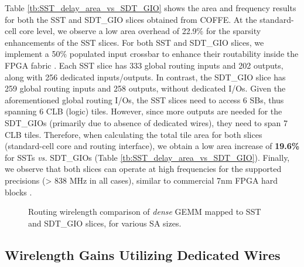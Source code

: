 Table \ref{tb:SST_delay_area_vs_SDT_GIO} shows the area and frequency results for both the SST and SDT\_GIO slices obtained from COFFE. 
At the standard-cell core level, we observe a low area overhead of 22.9\% for the sparsity enhancements of the SST slices.
For both SST and SDT\_GIO slices, we implement a 50\% populated input crossbar to enhance their routability inside the FPGA fabric \cite{COFFE2_TRETS_2019}. 
Each SST slice has 333 global routing inputs and 202 outputs, along with 256 dedicated inputs/outputs.
In contrast, the SDT\_GIO slice has 259 global routing inputs and 258 outputs, without dedicated I/Os.
Given the aforementioned global routing I/Os, the SST slices need to access 6 SBs, thus spanning 6  CLB (logic) tiles.
However, since more outputs are needed for the SDT\_GIOs (primarily due to absence of dedicated wires), they need to span 7 CLB tiles.
Therefore, when calculating the total tile area for both slices (standard-cell core and routing interface), we obtain a low area increase of \textbf{19.6\%} for 
SSTs \emph{vs.} SDT\_GIOs (Table \ref{tb:SST_delay_area_vs_SDT_GIO}).
Finally, we observe that both slices can operate at high frequencies for the supported precisions (> 838 MHz in all cases), similar to commercial 7nm FPGA hard blocks \cite{Versal_DSP_frequencies, Agilex_5_frequencies}. 






\begin{figure}[t]
\vspace{-0.50cm}
\centering
{}
\hfill
{}

\vspace{-0.3cm}

\caption{Routing wirelength comparison of \textit{dense} GEMM mapped to SST and SDT\_GIO slices, for various SA sizes.}
\label{fig:wirelength_SST_vs_GIO}
\vspace{-0.45cm}
\end{figure}


\subsection{Wirelength Gains Utilizing Dedicated Wires}
\label{subsec:Dedicated_wires_benefits}




